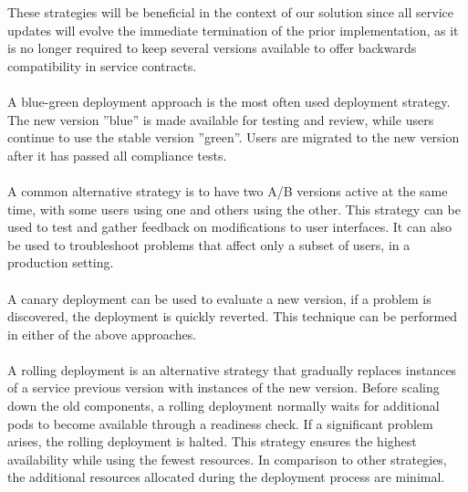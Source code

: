 These strategies will be beneficial in the context of our solution since all service updates will evolve the immediate termination of the prior implementation,
as it is no longer required to keep several versions available to offer backwards compatibility in service contracts.

\paragraph{}

A blue-green deployment approach is the most often used deployment strategy.
The new version ''blue'' is made available for testing and review, while users continue to use the stable version ''green''.
Users are migrated to the new version after it has passed all compliance tests.

\paragraph{}

A common alternative strategy is to have two A/B versions active at the same time, with some users using one and others using the other.
This strategy can be used to test and gather feedback on modifications to user interfaces.
It can also be used to troubleshoot problems that affect only a subset of users, in a production setting.

\paragraph{}

A canary deployment can be used to evaluate a new version, if a problem is discovered, the deployment is quickly reverted.
This technique can be performed in either of the above approaches.

\paragraph{}

A rolling deployment is an alternative strategy that gradually replaces instances of a service previous version with instances of the new version.
Before scaling down the old components, a rolling deployment normally waits for additional pods to become available through a readiness check.
If a significant problem arises, the rolling deployment is halted.
This strategy ensures the highest availability while using the fewest resources.
In comparison to other strategies, the additional resources allocated during the deployment process are minimal.


